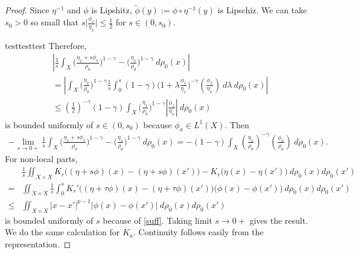 \documentclass[10pt, letterpaper]{article}
\def\dr{{d\rho_0(x)}}
\theoremstyle{definition}
\theoremstyle{remark}
\begin{document}
\begin{proof}
Since $\eta^{-1}$ and $\phi$ is Lipshitz, $\tilde \phi(y) := \phi\circ \eta^{-1}(y)$ is Lipschiz. We can take $s_0>0$ so small that $s\Big|\frac{\phi_x}{\eta_x}\Big| \le \frac{1}{2}$ for $s\in(0,s_0)$.


testtesttest
Therefore,
\begin{align*}
 &\left|\frac{1}{s}\int_X \Big(\frac{\eta_x + s\phi_x}{\rho_0}\Big)^{1-\gamma} -\Big(\frac{\eta_x}{\rho_0}\Big)^{1-\gamma} \: \dr\right|\\
 &= \left|\int_X \Big(\frac{\eta_x}{\rho_0}\Big)^{1-\gamma} \frac{1}{s}\int_0^s(1-\gamma)\Big(1 + \lambda\frac{\phi_x}{\eta_x}\Big)^{-\gamma}\left(\frac{\phi_x}{\eta_x}\right)\:d\lambda \: \dr\right|\\
 &\le \left(\frac{1}{2}\right)^{-\gamma}(1-\gamma)\int_X \Big(\frac{\eta_x}{\rho_0}\Big)^{1-\gamma} \left|\frac{\phi_x}{\eta_x}\right| \: \dr
\end{align*}
is bounded uniformly of $s\in(0,s_0)$ because $\phi_x \in L^1(X)$. Then
 \begin{align*}
  -\lim_{s \rightarrow 0+} \frac{1}{s} \int_X \Big(\frac{\eta_x + s\phi_x}{\rho_0}\Big)^{1-\gamma} -\Big(\frac{\eta_x}{\rho_0}\Big)^{1-\gamma} \: \dr  = -(1-\gamma)\int_X \left(\frac{\eta_x}{\rho_0}\right)^{-\gamma}\left(\frac{\phi_x}{\rho_0}\right) \: \dr.
 \end{align*}
For non-local parts, 
\begin{align*}
  &\frac{1}{s}\iint_{X\times X} K_r\Big( (\eta + s\phi)(x) - (\eta + s\phi)(x')\Big)- K_r\Big(\eta(x) - \eta(x')\Big) \: d\rho_0(x)d\rho_0(x') \\
  = &\iint_{X\times X}\frac{1}{s}\int_0^s K_r'\Big( (\eta + \tau\phi)(x) - (\eta + \tau\phi)(x')\Big)\Big(\phi(x)-\phi(x')\Big)\: d\rho_0(x)d\rho_0(x')\\
  \le &\iint_{X\times X} |x-x'|^{p-1} |\phi(x)-\phi(x')| \: d\rho_0(x)d\rho_0(x') 
\end{align*}
is bounded uniformly of $s$ because of \eqref{suff}. Taking limit $s \rightarrow 0+$ gives the result. We do the same calculation for $K_a$. Continuity follows easily from the representation. %
\end{proof}
\end{document}
